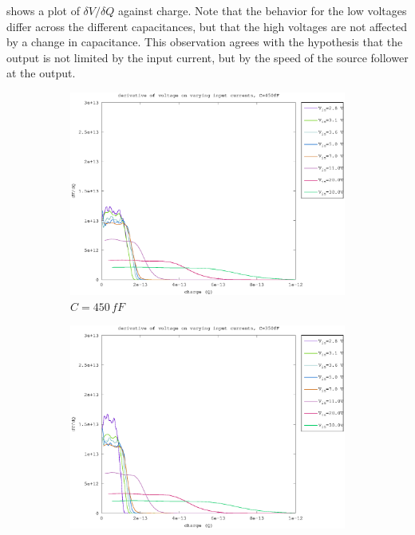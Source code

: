  shows a plot of $\delta V/\delta Q$ against charge. Note that the behavior for the low voltages differ across the different capacitances, but that the high voltages are not affected by a change in capacitance. This observation agrees with the hypothesis that the output is not limited by the input current, but by the speed of the source follower at the output.

\begin{figure}[h]
    \centering
    \begin{subfigure}[b]{0.475\textwidth}
        \centering
        \includegraphics[width=\textwidth]{fig/bre_d_slope_450fF.eps}
        \caption[Network2]%
        {$C=450\,fF$}    
        \label{fig:bre_d_slopes_450fF}
    \end{subfigure}
    \hfill
    \begin{subfigure}[b]{0.475\textwidth}  
        \centering 
        \includegraphics[width=\textwidth]{fig/bre_d_slope_350fF.eps}

\end{subfigure}
\end{figure}
